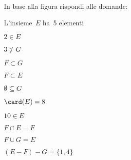 \begin{multicols}{2}
\begin{esercizio}
\label{ese:7.64}
In base alla figura rispondi alle domande:
\TabPositions{4.5cm}
\begin{enumeratea}
\item L'insieme~$E$ ha~5 elementi \tab\boxV\quad\boxF
\item $2\in E$ \tab\boxV\quad\boxF
\item $3\notin G$ \tab\boxV\quad\boxF
\item $F\subset G$ \tab\boxV\quad\boxF
\item $F\subset E$ \tab\boxV\quad\boxF
\item $\emptyset \subseteq G$ \tab\boxV\quad\boxF
\item $\card(E)=8$ \tab\boxV\quad\boxF
\item $10\in E$ \tab\boxV\quad\boxF
\item $F\cap E=F$ \tab\boxV\quad\boxF
\item $F\cup G=E$ \tab\boxV\quad\boxF
\item $(E-F)-G=\{1,4\}$ \tab\boxV\quad\boxF
\end{enumeratea}
\begin{center}
 
\end{center}
\end{esercizio}

\end{multicols}

